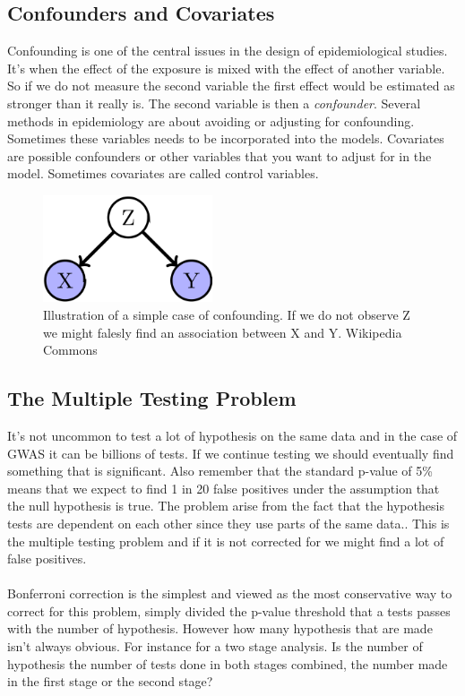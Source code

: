 \documentclass[10pt,a4paper]{report}
\begin{document}
\subsection{Confounders and Covariates}
Confounding is one of the central issues in the design of epidemiological studies. It's when the effect of the exposure is mixed with the effect of another variable. So if we do not measure the second variable the first effect would be estimated as stronger than it really is. The second variable is then a \emph{confounder}. Several methods in epidemiology are about avoiding or adjusting for confounding. Sometimes these variables needs to be incorporated into the models. Covariates are possible confounders or other variables that you want to adjust for in the model. Sometimes covariates are called control variables.\cite{rothman2002intro_epidemiology,rothman1998modern}

\begin{figure}[h]
    \centering
    \includegraphics[width=5cm]{Simple_Confounding_Case.png}
    \caption{Illustration of a simple case of confounding. If we do not observe Z we might falesly find an association between X and Y. Wikipedia Commons}
    \label{fig:confunding}
\end{figure}

\subsection{The Multiple Testing Problem}
It's not uncommon to test a lot of hypothesis on the same data and in the case of GWAS it can be billions of tests. If we continue testing we should eventually find something that is significant. Also remember that the standard p-value of 5\% means that we expect to find 1 in 20 false positives under the assumption that the null hypothesis is true. The problem arise from the fact that the hypothesis tests are dependent on each other since they use parts of the same data.. This is the multiple testing problem and if it is not corrected for we might find a lot of false positives.\cite{bonferroni_multiple}\\
\\
Bonferroni correction is the simplest and viewed as the most conservative way to correct for this problem, simply divided the p-value threshold that a tests passes with the number of hypothesis. However how many hypothesis that are made isn't always obvious. For instance for a two stage analysis. Is the number of hypothesis the number of tests done in both stages combined, the number made in the first stage or the second stage?\cite{bonferroni_multiple}
\end{document}
